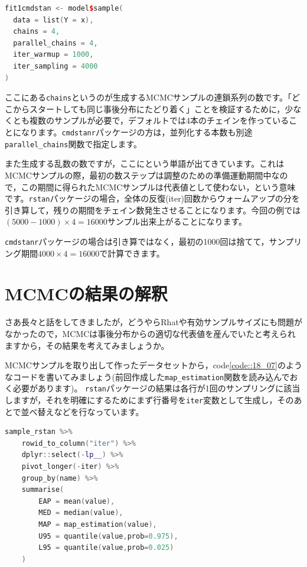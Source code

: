 \documentclass{ltjsbook}
\begin{document}
\begin{lstlisting}[language=C++,label={code::18_06},caption={cmdstanrパッケージによるオプション指定}]
fit1cmdstan <- model$sample(
  data = list(Y = x),
  chains = 4,
  parallel_chains = 4,
  iter_warmup = 1000,
  iter_sampling = 4000
)
\end{lstlisting}

ここにある\texttt{chains}というのが生成するMCMCサンプルの連鎖系列の数です。「どこからスタートしても同じ事後分布にたどり着く」ことを検証するために，少なくとも複数のサンプルが必要で，デフォルトでは4本のチェインを作っていることになります。\texttt{cmdstanr}パッケージの方は，並列化する本数も別途\verb|parallel_chains|関数で指定します。

また生成する乱数の数ですが，ここにという単語が出てきています。これはMCMCサンプルの際，最初の数ステップは調整のための準備運動期間中なので，この期間に得られたMCMCサンプルは代表値として使わない，という意味です。\texttt{rstan}パッケージの場合，全体の反復(iter)回数からウォームアップの分を引き算して，残りの期間をチェイン数発生させることになります。今回の例では$(5000-1000)\times 4=16000$サンプル出来上がることになります。

\texttt{cmdstanr}パッケージの場合は引き算ではなく，最初の1000回は捨てて，サンプリング期間$4000\times 4=16000$で計算できます。

\section{MCMCの結果の解釈}
さあ長々と話をしてきましたが，どうやらRhatや有効サンプルサイズにも問題がなかったので，MCMCは事後分布からの適切な代表値を産んでいたと考えられますから，その結果を考えてみましょうか。

MCMCサンプルを取り出して作ったデータセットから，code\ref{code::18_07}のようなコードを書いてみましょう(前回作成した\verb|map_estimation|関数を読み込んでおく必要があります)。
\texttt{rstan}パッケージの結果は各行が1回のサンプリングに該当しますが，それを明確にするためにまず行番号を\texttt{iter}変数として生成し，そのあとで並べ替えなどを行なっています。

\begin{lstlisting}[language=C++,label={code::18_07},caption={rstanパッケージによる結果の要約}]
sample_rstan %>% 
    rowid_to_column("iter") %>%
    dplyr::select(-lp__) %>% 
    pivot_longer(-iter) %>% 
    group_by(name) %>% 
    summarise(
        EAP = mean(value),
        MED = median(value),
        MAP = map_estimation(value),
        U95 = quantile(value,prob=0.975),
        L95 = quantile(value,prob=0.025)
    )
\end{lstlisting}
\end{document}
